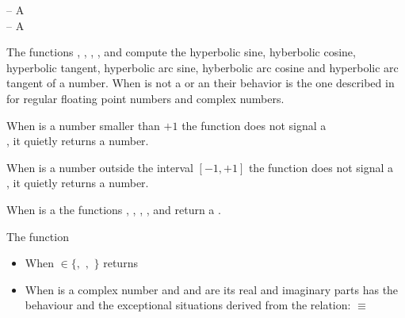 \documentclass[../Exponentials-Logarithms-Trigonometry.tex]{subfiles}
\begin{document}

\DSyntax{}

  \RArrow {}\\
  \RArrow {}\\
  \RArrow {}\\
  \RArrow {}\\
  \RArrow {}\\
  \RArrow {}

\DArgsNValues{}

 -- A \\
 -- A 

\DDescription{}

The functions , , , ,
 and  compute the hyperbolic
sine, hyberbolic cosine, hyperbolic tangent, hyperbolic
arc sine, hyberbolic arc cosine and hyperbolic arc tangent of a number. When
 is not a  or an
 their behavior is the one described in
\cite{1996:ANSIHyperSpec} for regular floating point numbers and complex
numbers.

\noindent
When  is a  number smaller than $+1$ the function
 does not signal a \\, it
quietly returns a  number.

\noindent
When  is a  number outside the interval $[-1, +1]$
the function  does not signal a \\
, it quietly
returns a  number.

\noindent
When  is a  the functions ,
, , ,  and  return
a .

\noindent
The function 
\begin{itemize}
  \item When  $\in \{$$,$
  $,$ $\}$ returns 
  \item When  is a complex number and   and 
  are its real and imaginary parts has the behaviour and the exceptional
  situations derived from the relation: \code{)}
  $\equiv$ \code{ (-
  }\code{)))}
\end{itemize}
\end{document}
